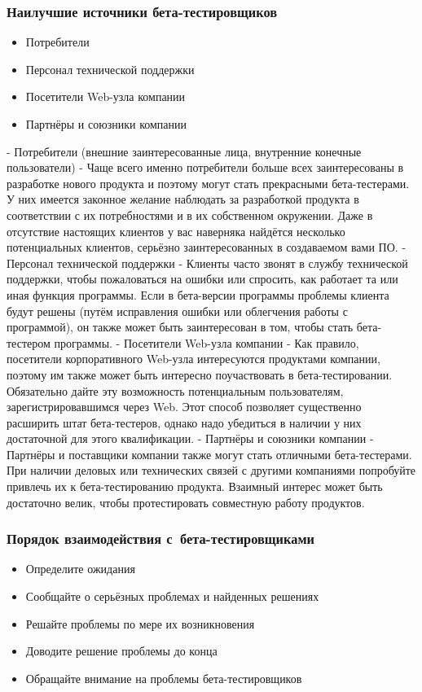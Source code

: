 \documentclass{../industrial-development}
\begin{document}
\begin{frame} \frametitle{Наилучшие источники бета-тестировщиков}
	\begin{itemize}
		\item Потребители
		\item Персонал технической поддержки
		\item Посетители Web-узла компании
		\item Партнёры и союзники компании
	\end{itemize}
\end{frame}
\lecturenotes
- Потребители (внешние заинтересованные лица, внутренние конечные пользователи) - Чаще всего именно потребители больше всех заинтересованы в разработке нового продукта и поэтому могут стать прекрасными бета-тестерами. У них имеется законное желание наблюдать за разработкой продукта в соответствии с их потребностями и в их собственном окружении. Даже в отсутствие настоящих клиентов у вас наверняка найдётся несколько потенциальных клиентов, серьёзно заинтересованных в создаваемом вами ПО.
- Персонал технической поддержки - Клиенты часто звонят в службу технической поддержки, чтобы пожаловаться на ошибки или спросить, как работает та или иная функция программы. Если в бета-версии программы проблемы клиента будут решены (путём исправления ошибки или облегчения работы с программой), он также может быть заинтересован в том, чтобы стать бета-тестером программы.
- Посетители Web-узла компании - Как правило, посетители корпоративного Web-узла интересуются продуктами компании, поэтому им также может быть интересно поучаствовать в бета-тестировании. Обязательно дайте эту возможность потенциальным пользователям, зарегистрировавшимся через Web. Этот способ позволяет существенно расширить штат бета-тестеров, однако надо убедиться в наличии у них достаточной для этого квалификации.
- Партнёры и союзники компании - Партнёры и поставщики компании также могут стать отличными бета-тестерами. При наличии деловых или технических связей с другими компаниями попробуйте привлечь их к бета-тестированию продукта. Взаимный интерес может быть достаточно велик, чтобы протестировать совместную работу продуктов.

\begin{frame} \frametitle{Порядок взаимодействия с~бета-тестировщиками}
	\begin{itemize}
		\item Определите ожидания
		\item Сообщайте о серьёзных проблемах и найденных решениях
		\item Решайте проблемы по мере их возникновения
		\item Доводите решение проблемы до конца
		\item Обращайте внимание на проблемы бета-тестировщиков
	\end{itemize}
\end{frame}
\end{document}
